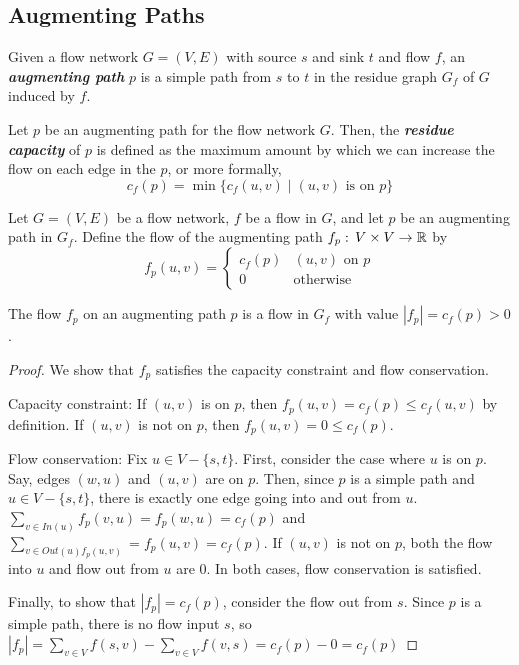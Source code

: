 \subsection{Augmenting Paths}

\vspace{\parskip}

\begin{definition} 
    Given a flow network $G=(V,E)$ with source $s$ and sink $t$ and flow $f$, an \textit{\textbf{augmenting path}} $p$ is a simple path from $s$ to $t$ in the residue graph $G_f$ of $G$ induced by $f$.
\end{definition}

\begin{definition}
    Let $p$ be an augmenting path for the flow network $G$. Then, the \textit{\textbf{residue capacity}} of $p$ is defined as the maximum amount by which we can increase the flow on each edge in the $p$, or more formally,
    $$
    c_f(p) = \min \{c_f(u,v) \mid \text{$(u,v)$ is on $p$} \}
    $$
\end{definition}

\begin{definition}
    Let $G=(V,E)$ be a flow network, $f$ be a flow in $G$, and let $p$ be an augmenting path in $G_f$. Define the flow of the augmenting path $f_p:\, V \times V \to \mathbb{R}$ by
    $$
    f_p(u,v) = \begin{cases}
        c_f(p) & \text{$(u,v)$ on $p$} \\
        0 & \text{otherwise}
    \end{cases}
    $$
\end{definition}

\begin{lemma} \label{lem:augmenting-flow}
    The flow $f_p$ on an augmenting path $p$ is a flow in $G_f$ with value $|f_p| = c_f(p) > 0$.
\end{lemma}

\begin{proof}
    We show that $f_p$ satisfies the capacity constraint and flow conservation.

    Capacity constraint: If $(u,v)$ is on $p$, then $f_p(u,v)=c_f(p) \leq c_f(u,v)$ by definition. If $(u,v)$ is not on $p$, then $f_p(u,v) = 0 \leq c_f(p)$.

    Flow conservation: Fix $u \in V - \{s,t\}$. First, consider the case where $u$ is on $p$. Say, edges $(w,u)$ and $(u,v)$ are on $p$. Then, since $p$ is a simple path and $u \in V-\{s,t\}$, there is exactly one edge going into and out from $u$. $\sum_{v \in In(u)} f_p(v,u) = f_p(w,u) = c_f(p)$ and $\sum_{v \in Out(u) f_p(u,v)} = f_p(u,v) = c_f(p)$. If $(u,v)$ is not on $p$, both the flow into $u$ and flow out from $u$ are 0. In both cases, flow conservation is satisfied.

    Finally, to show that $|f_p| = c_f(p)$, consider the flow out from $s$. Since $p$ is a simple path, there is no flow input $s$, so $|f_p| = \sum_{v \in V} f(s,v) - \sum_{v \in V} f(v,s) = c_f(p) - 0 = c_f(p)$ 
\end{proof}

